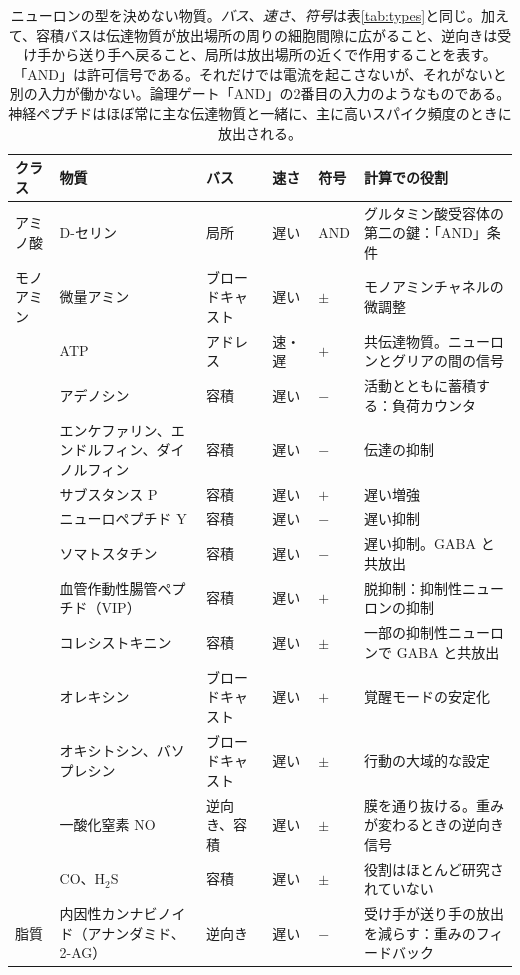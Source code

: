 \begin{table}[t]
\centering
\footnotesize
\setlength{\tabcolsep}{4pt}
\renewcommand{\arraystretch}{1.12}
\begin{tabular}{>{\raggedright}p{2.0cm}>{\raggedright}p{2.6cm}>{\raggedright}p{2.55cm}>{\raggedright}p{1.3cm}>{\centering}p{0.8cm}>{\raggedright\arraybackslash}p{4.2cm}}
\toprule
クラス & 物質 & バス & 速さ & 符号 & 計算での役割 \\
\midrule
アミノ酸 & D-セリン & 局所 & 遅い & AND & グルタミン酸受容体の第二の鍵：「AND」条件 \\
\midrule
モノアミン & 微量アミン & ブロードキャスト & 遅い & $\pm$ & モノアミンチャネルの微調整 \\
\midrule
\multirow{2}{2.0cm}{プリン}
 & ATP & アドレス & 速・遅 & $+$ & 共伝達物質。ニューロンとグリアの間の信号 \\
 & アデノシン & 容積 & 遅い & $-$ & 活動とともに蓄積する：負荷カウンタ\cite{Dunwiddie2001} \\
\midrule
\multirow{8}{2.0cm}{神経ペプチド（100種以上）}
 & エンケファリン、エンドルフィン、ダイノルフィン & 容積 & 遅い & $-$ & 伝達の抑制 \\
 & サブスタンス P & 容積 & 遅い & $+$ & 遅い増強 \\
 & ニューロペプチド Y & 容積 & 遅い & $-$ & 遅い抑制 \\
 & ソマトスタチン & 容積 & 遅い & $-$ & 遅い抑制。GABA と共放出 \\
 & 血管作動性腸管ペプチド（VIP） & 容積 & 遅い & $+$ & 脱抑制：抑制性ニューロンの抑制 \\
 & コレシストキニン & 容積 & 遅い & $\pm$ & 一部の抑制性ニューロンで GABA と共放出 \\
 & オレキシン & ブロードキャスト & 遅い & $+$ & 覚醒モードの安定化 \\
 & オキシトシン、バソプレシン & ブロードキャスト & 遅い & $\pm$ & 行動の大域的な設定 \\
\midrule
\multirow{2}{2.0cm}{気体}
 & 一酸化窒素 NO & 逆向き、容積 & 遅い & $\pm$ & 膜を通り抜ける。重みが変わるときの逆向き信号\cite{Garthwaite2008} \\
 & CO、H$_2$S & 容積 & 遅い & $\pm$ & 役割はほとんど研究されていない \\
\midrule
脂質 & 内因性カンナビノイド（アナンダミド、2-AG） & 逆向き & 遅い & $-$ & 受け手が送り手の放出を減らす：重みのフィードバック\cite{WilsonNicoll2001} \\
\bottomrule
\end{tabular}
\caption{ニューロンの型を決めない物質。\emph{バス}、\emph{速さ}、\emph{符号}は表\ref{tab:types}と同じ。加えて、容積バスは伝達物質が放出場所の周りの細胞間隙に広がること、逆向きは受け手から送り手へ戻ること、局所は放出場所の近くで作用することを表す。「AND」は許可信号である。それだけでは電流を起こさないが、それがないと別の入力が働かない。論理ゲート「AND」の2番目の入力のようなものである。神経ペプチドはほぼ常に主な伝達物質と一緒に、主に高いスパイク頻度のときに放出される\cite{vandenPol2012}。}
\label{tab:othermediators}
\end{table}
